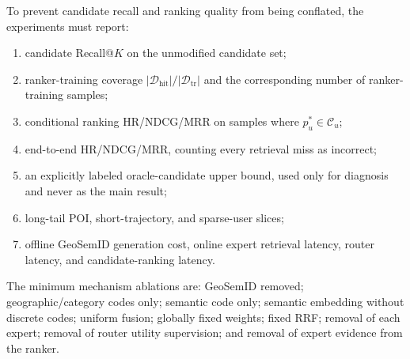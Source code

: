 \documentclass[journal]{IEEEtran}
\begin{document}
To prevent candidate recall and ranking quality from being conflated, the
experiments must report:
\begin{enumerate}[leftmargin=*,nosep]
\item candidate Recall@$K$ on the unmodified candidate set;
\item ranker-training coverage
$|\mathcal{D}_{\mathrm{hit}}|/|\mathcal{D}_{\mathrm{tr}}|$ and the corresponding
number of ranker-training samples;
\item conditional ranking HR/NDCG/MRR on samples where
$p_u^{*}\in\mathcal{C}_u$;
\item end-to-end HR/NDCG/MRR, counting every retrieval miss as incorrect;
\item an explicitly labeled oracle-candidate upper bound, used only for
diagnosis and never as the main result;
\item long-tail POI, short-trajectory, and sparse-user slices;
\item offline GeoSemID generation cost, online expert retrieval latency,
router latency, and candidate-ranking latency.
\end{enumerate}

The minimum mechanism ablations are:
GeoSemID removed; geographic/category codes only; semantic code only;
semantic embedding without discrete codes; uniform fusion; globally fixed
weights; fixed RRF; removal of each expert; removal of router utility
supervision; and removal of expert evidence from the ranker.


% 
\end{document}
